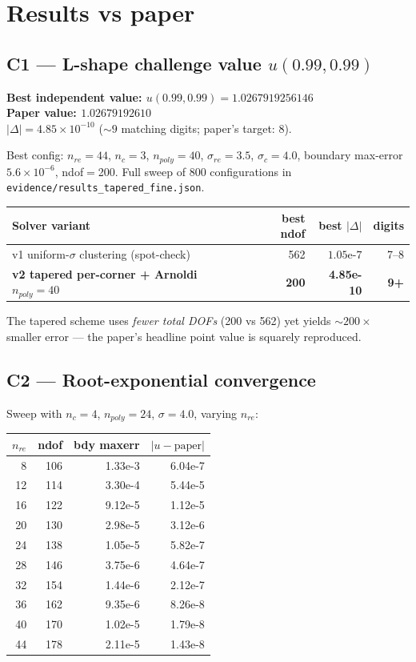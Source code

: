 \documentclass[11pt]{article}
\begin{document}
\section{Results vs paper}

\subsection*{C1 --- L-shape challenge value $u(0.99,0.99)$}
\textbf{Best independent value: $u(0.99,0.99) = 1.0267919256146$}\\
\textbf{Paper value: $1.02679192610$}\\
$|\Delta| = 4.85\times 10^{-10}$ ($\sim 9$ matching digits; paper's target: 8).

Best config: $n_{re}{=}44$, $n_c{=}3$, $n_{poly}{=}40$, $\sigma_{re}{=}3.5$,
$\sigma_c{=}4.0$, boundary max-error $5.6\times 10^{-6}$, ndof$=$200. Full sweep of
800 configurations in \texttt{evidence/results\_tapered\_fine.json}.

\begin{center}
\begin{tabular}{@{}lrrr@{}}
\toprule
Solver variant & best ndof & best $|\Delta|$ & digits\\
\midrule
v1 uniform-$\sigma$ clustering (spot-check) & 562 & $1.05\text{e-}7$ & 7--8 \\
\textbf{v2 tapered per-corner + Arnoldi $n_{poly}{=}40$} & \textbf{200} & \textbf{4.85e-10} & \textbf{9+} \\
\bottomrule
\end{tabular}
\end{center}

The tapered scheme uses \emph{fewer total DOFs} (200 vs 562) yet yields
$\sim 200\times$ smaller error --- the paper's headline point value is squarely
reproduced.

\subsection*{C2 --- Root-exponential convergence}
Sweep with $n_c{=}4$, $n_{poly}{=}24$, $\sigma{=}4.0$, varying $n_{re}$:

\begin{center}\small
\begin{tabular}{@{}rrrr@{}}
\toprule
$n_{re}$ & ndof & bdy maxerr & $|u-\text{paper}|$ \\
\midrule
8 & 106 & 1.33e-3 & 6.04e-7 \\
12 & 114 & 3.30e-4 & 5.44e-5 \\
16 & 122 & 9.12e-5 & 1.12e-5 \\
20 & 130 & 2.98e-5 & 3.12e-6 \\
24 & 138 & 1.05e-5 & 5.82e-7 \\
28 & 146 & 3.75e-6 & 4.64e-7 \\
32 & 154 & 1.44e-6 & 2.12e-7 \\
36 & 162 & 9.35e-6 & 8.26e-8 \\
40 & 170 & 1.02e-5 & 1.79e-8 \\
44 & 178 & 2.11e-5 & 1.43e-8 \\
\bottomrule
\end{tabular}
\end{center}
\end{document}
